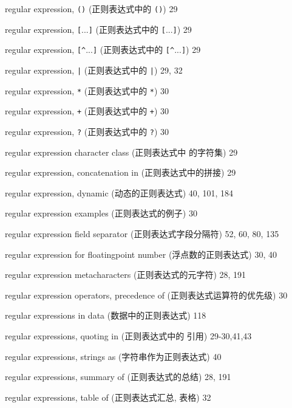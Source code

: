 \begin{multicols}{2}
\hangindent=2pc  regular expression, \verb'()' (正则表达式中的
\verb'()') 29

\hangindent=2pc  regular expression, \verb'['...\verb']'
(正则表达式中的 \verb'['...\verb']') 29

\hangindent=2pc  regular expression, \verb'[^'...\verb']'
(正则表达式中的 \verb'[^'...\verb']') 29

\hangindent=2pc  regular expression, \verb'|' (正则表达式中的
\verb'|') 29, 32

\hangindent=2pc  regular expression, \verb'*' (正则表达式中的
\verb'*') 30

\hangindent=2pc  regular expression, \verb'+' (正则表达式中的
\verb'+') 30

\hangindent=2pc  regular expression, \verb'?' (正则表达式中的
\verb'?') 30

\hangindent=2pc  regular expression character class (正则表达式中 
的字符集) 29

\hangindent=2pc  regular expression, concatenation in
(正则表达式中的拼接) 29

\hangindent=2pc  regular expression, dynamic (动态的正则表达式) 40, 101, 184

\hangindent=2pc  regular expression examples (正则表达式的例子) 30

\hangindent=2pc  regular expression field separator
(正则表达式字段分隔符) 52, 60, 80, 135

\hangindent=2pc  regular expression for floatingpoint number
(浮点数的正则表达式) 30, 40

\hangindent=2pc  regular expression metacharacters (正则表达式的元字符) 28, 191

\hangindent=2pc  regular expression operators, precedence of
(正则表达式运算符的优先级) 30

\hangindent=2pc  regular expressions in data
(数据中的正则表达式) 118

\hangindent=2pc  regular expressions, quoting in (正则表达式中的 
引用) 29-30,41,43

\hangindent=2pc  regular expressions, strings as
(字符串作为正则表达式) 40

\hangindent=2pc  regular expressions, summary of
(正则表达式的总结) 28, 191

\hangindent=2pc  regular expressions, table of (正则表达式汇总,
表格) 32


\end{multicols}
